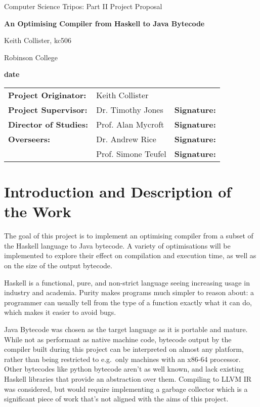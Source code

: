 \documentclass[12pt]{article}
\begin{document}
\thispagestyle{empty}

\centerline{\large Computer Science Tripos: Part II Project Proposal}
\vspace{0.4in}
\centerline{\Large\bf An Optimising Compiler from Haskell to Java Bytecode}
\vspace{0.3in}

\centerline{Keith Collister, kc506}
\centerline{Robinson College}

\centerline{\large \textbf{date}}

\vspace{1in}

\begin{tabular}{ p{4cm} p{4.5cm} l }
{\bf Project Originator:} & Keith Collister & \\[3mm]
{\bf Project Supervisor:} & Dr. Timothy Jones & {\bf Signature:} \\[3mm]
{\bf Director of Studies:} & Prof. Alan Mycroft & {\bf Signature:} \\[3mm]
{\bf Overseers:} & Dr. Andrew Rice & {\bf Signature:} \\[3mm]
                 & Prof. Simone Teufel & {\bf Signature:} \\[3mm]
\end{tabular}

\vspace{0.75in}




\section*{Introduction and Description of the Work}

The goal of this project is to implement an optimising compiler from a subset of the Haskell language to Java bytecode.
A variety of optimisations will be implemented to explore their effect on compilation and execution time, as well as on
the size of the output bytecode.

Haskell is a functional, pure, and non-strict language seeing increasing usage in industry and academia. Purity makes
programs much simpler to reason about: a programmer can usually tell from the type of a function exactly what it can do,
which makes it easier to avoid bugs.

Java Bytecode was chosen as the target language as it is portable and mature. While not as performant as native machine
code, bytecode output by the compiler built during this project can be interpreted on almost any platform, rather than
being restricted to e.g.\ only machines with an x86-64 processor. Other bytecodes like python bytecode aren't as
well known, and lack existing Haskell libraries that provide an abstraction over them. Compiling to LLVM IR was
considered, but would require implementing a garbage collector which is a significant piece of work that's not aligned
with the aims of this project.
\end{document}

